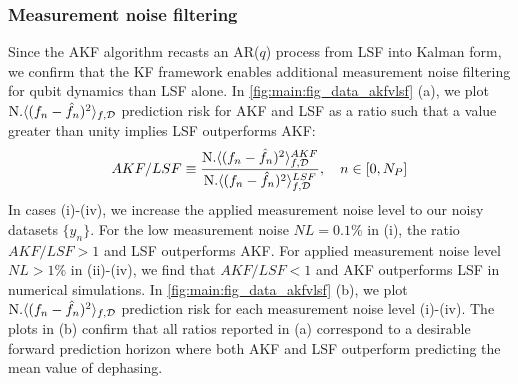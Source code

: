 \documentclass[pra, reprint]{revtex4-1}
\begin{document}
\subsubsection{Measurement noise filtering}
Since the AKF algorithm recasts an AR($q$) process from LSF into Kalman form, we confirm that the KF framework enables additional measurement noise filtering for qubit dynamics than LSF alone. In \cref{fig:main:fig_data_akfvlsf} (a), we plot $\text{N.} \langle (f_n - \hat{f}_n)^2 \rangle_{f, \mathcal{D}}$ prediction risk for AKF and LSF as a ratio such that a value greater than unity implies LSF outperforms AKF:
\begin{align}
AKF / LSF \equiv \frac{\text{N.} \langle (f_n - \hat{f}_n)^2 \rangle_{f, \mathcal{D}} ^{AKF}}{\text{N.} \langle (f_n - \hat{f}_n)^2 \rangle_{f, \mathcal{D}}^{LSF}}, \quad n \in [0, N_P]
\end{align}
In cases (i)-(iv), we increase the applied measurement noise level to our noisy datasets $\{ y_n \}$. For the low measurement noise $NL = 0.1\%$ in (i), the ratio $AKF/LSF > 1$ and LSF outperforms AKF. For applied measurement noise level $NL > 1\%$ in (ii)-(iv), we find that $AKF/LSF <1 $ and AKF outperforms LSF in numerical simulations. In \cref{fig:main:fig_data_akfvlsf} (b), we plot $\text{N.} \langle (f_n - \hat{f}_n)^2 \rangle_{f, \mathcal{D}}$ prediction risk for each measurement noise level (i)-(iv). The plots in (b) confirm that all ratios reported in (a) correspond to a desirable forward prediction horizon where both AKF and LSF outperform predicting the mean value of dephasing. 
\end{document}
